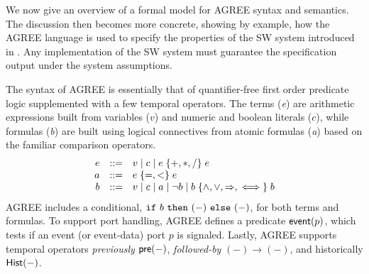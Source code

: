 \begin{comment}
This section gives an abstract mathematical overview of AGREE's
compositional reasoning system, defining assume-guarantee contracts
and the verification conditions that AGREE checks in order to
modularly establish overall system correctness at the model level.
The syntax and semantics of AGREE are sketched in some detail.  The
discussion then becomes more concrete, showing---by example---how the
AGREE contract language is used to specify the cyber-hardened system
of \figref{fig:hardened}. The discussion proceeds from the
system-level contract to the filter and monitor components, which rely
on the notion of a \emph{code contract} to support code generation.
\end{comment}

We now give an overview of a formal model for AGREE syntax and
semantics.  The discussion then becomes more concrete, showing by
example, how the AGREE language is used to specify the properties of
the SW system introduced in .  Any implementation
of the SW system must guarantee the specification output under the
system assumptions.

The syntax of AGREE is essentially that of quantifier-free first order
predicate logic supplemented with a few temporal operators. The terms
(\emph{e}) are arithmetic expressions built from variables ($v$) and
numeric and boolean literals ($c$), while formulas (\emph{b}) are
built using logical connectives from atomic formulas (\emph{a}) based
on the familiar comparison operators.
\[
\begin{array}{rcl}
e & ::= & v \mid c \mid e \;\{ {+,*,/} \}\; e \\
a & ::= & e\; \{ {=,<} \}\; e \\
b & ::= & v \mid c \mid a \mid \neg b
            \mid b \; \{ {\land,\lor,\Rightarrow,\iff} \}\; b
\end{array}
\]
AGREE includes a conditional, $\mbox{$\mathtt{if}\ {b}\ \mathtt{then}\ {(-)}\ \mathtt{else}\ {(-)}$}$, for both terms
and formulas. To support port handling, AGREE defines a predicate
$\mathsf{event}(p)$, which tests if an event (or event-data) port $p$ is
signaled. Lastly, AGREE supports temporal operators \emph{previously}
$\mathsf{pre}(-)$, \emph{followed-by} $(-) \to (-)$, and historically
$\mathsf{Hist}(-)$.

